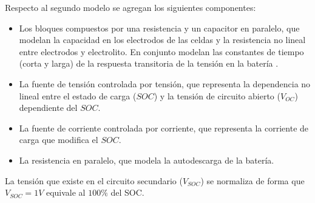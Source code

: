 Respecto al segundo modelo se agregan los siguientes componentes:
\begin{itemize}
    \item Los bloques compuestos por una resistencia y un capacitor en paralelo, que modelan la capacidad en los electrodos de las celdas y
    la resistencia no lineal entre electrodos y electrolito.
    En conjunto modelan las constantes de tiempo (corta y larga) de la respuesta transitoria de la tensión en la batería \cite{modelo_bateria_2}.
    \item La fuente de tensión controlada por tensión, que representa la dependencia no lineal entre el estado de carga ($SOC$)
    y la tensión de circuito abierto ($V_{OC}$) dependiente del $SOC$.
    \item La fuente de corriente controlada por corriente, que representa la corriente de carga que modifica el $SOC$.
    \item La resistencia en paralelo, que modela la autodescarga de la batería.
\end{itemize}

La tensión que existe en el circuito secundario ($V_{SOC}$) se normaliza de forma que $V_{SOC}=1V$ equivale al $100\%$ del SOC.